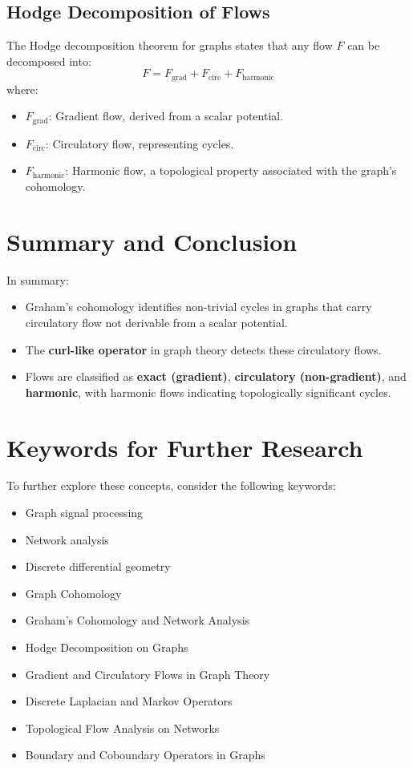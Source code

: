 \documentclass[10pt,a4paper,twocolumn]{article}
\begin{document}
	\subsection{Hodge Decomposition of Flows}
	The Hodge decomposition theorem for graphs states that any flow \( F \) can be decomposed into:
	\[
	F = F_{\text{grad}} + F_{\text{circ}} + F_{\text{harmonic}}
	\]
	where:
	\begin{itemize}
		\item \( F_{\text{grad}} \): Gradient flow, derived from a scalar potential.
		\item \( F_{\text{circ}} \): Circulatory flow, representing cycles.
		\item \( F_{\text{harmonic}} \): Harmonic flow, a topological property associated with the graph’s cohomology.
	\end{itemize}
	
	\section{Summary and Conclusion}
	In summary:
	\begin{itemize}
		\item Graham's cohomology identifies non-trivial cycles in graphs that carry circulatory flow not derivable from a scalar potential.
		\item The \textbf{curl-like operator} in graph theory detects these circulatory flows.
		\item Flows are classified as \textbf{exact (gradient)}, \textbf{circulatory (non-gradient)}, and \textbf{harmonic}, with harmonic flows indicating topologically significant cycles.
	\end{itemize}
	
	\section{Keywords for Further Research}
	To further explore these concepts, consider the following keywords:
	\begin{itemize}
		\item Graph signal processing
		\item Network analysis
		\item Discrete differential geometry
		\item Graph Cohomology
		\item Graham's Cohomology and Network Analysis
		\item Hodge Decomposition on Graphs
		\item Gradient and Circulatory Flows in Graph Theory
		\item Discrete Laplacian and Markov Operators
		\item Topological Flow Analysis on Networks
		\item Boundary and Coboundary Operators in Graphs
	\end{itemize}
	
\end{document}
